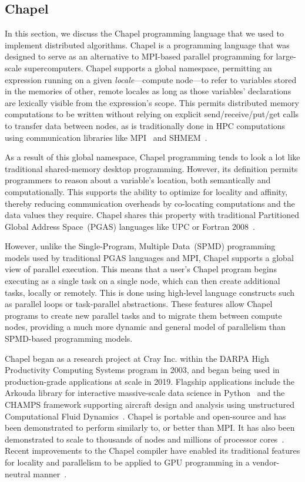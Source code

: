 \subsection{Chapel}

In this section, we discuss the Chapel programming language that we used to implement distributed algorithms. Chapel is a programming language that was designed to serve as an alternative to MPI-based parallel programming for large-scale supercomputers. Chapel supports a global namespace, permitting an expression running on a given \emph{locale}---compute node---to refer to variables stored in the memories of other, remote locales as long as those variables' declarations are lexically visible from the expression's scope. This permits distributed memory computations to be written without relying on explicit send/receive/put/get calls to transfer data between nodes, as is traditionally done in HPC computations using communication libraries like MPI~\cite{mpi41} and SHMEM~\cite{Chapman2010intro}.

As a result of this global namespace, Chapel programming tends to look a lot like traditional shared-memory desktop programming. However, its definition permits programmers to reason about a variable's location, both semantically and computationally. This supports the ability to optimize for locality and affinity, thereby reducing communication overheads by co-locating computations and the data values they require. Chapel shares this property with traditional Partitioned Global Address Space~(PGAS) languages like UPC or Fortran 2008~\cite{ElGhazawi2005upc,Fortran2008}.

However, unlike the Single-Program, Multiple Data~(SPMD) programming models used by traditional PGAS languages and MPI, Chapel supports a global view of parallel execution. This means that a user's Chapel program begins executing as a single task on a single node, which can then create additional tasks, locally or remotely. This is done using high-level language constructs such as parallel loops or task-parallel abstractions. These features allow Chapel programs to create new parallel tasks and to migrate them between compute nodes, providing a much more dynamic and general model of parallelism than SPMD-based programming models.

Chapel began as a research project at Cray Inc. within the DARPA High Productivity Computing Systems program in 2003, and began being used in production-grade applications at scale in 2019. Flagship applications include the Arkouda library for interactive massive-scale data science in Python~\cite{Merrill2019arkou} and the CHAMPS framework supporting aircraft design and analysis using unstructured Computational Fluid Dynamics~\cite{Parent2021DevelopmentOf}. Chapel is portable and open-source and has been demonstrated to perform similarly to, or better than MPI. It has also been demonstrated to scale to thousands of nodes and millions of processor cores~\cite{Chambe2023PracticalExamp}. Recent improvements to the Chapel compiler have enabled its traditional features for locality and parallelism to be applied to GPU programming in a vendor-neutral manner~\cite{Kayrak2023RecentGpuProg}.

